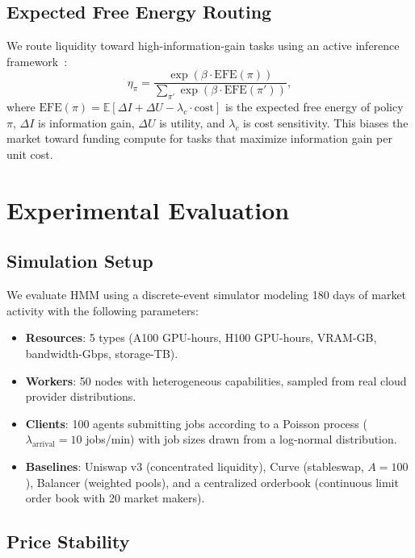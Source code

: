 \documentclass[11pt,twocolumn]{article}
\begin{document}
\subsection{Expected Free Energy Routing}

We route liquidity toward high-information-gain tasks using an active inference framework~\cite{friston2017active}:
\begin{equation}
\eta_\pi = \frac{\exp(\beta \cdot \text{EFE}(\pi))}{\sum_{\pi'} \exp(\beta \cdot \text{EFE}(\pi'))},
\end{equation}
where $\text{EFE}(\pi) = \mathbb{E}[\Delta I + \Delta U - \lambda_c \cdot \text{cost}]$ is the expected free energy of policy $\pi$, $\Delta I$ is information gain, $\Delta U$ is utility, and $\lambda_c$ is cost sensitivity. This biases the market toward funding compute for tasks that maximize information gain per unit cost.

\section{Experimental Evaluation}
\label{sec:experiments}

\subsection{Simulation Setup}

We evaluate HMM using a discrete-event simulator modeling 180 days of market activity with the following parameters:

\begin{itemize}[leftmargin=1.1em]
    \item \textbf{Resources}: 5 types (A100 GPU-hours, H100 GPU-hours, VRAM-GB, bandwidth-Gbps, storage-TB).
    \item \textbf{Workers}: 50 nodes with heterogeneous capabilities, sampled from real cloud provider distributions.
    \item \textbf{Clients}: 100 agents submitting jobs according to a Poisson process ($\lambda_{\text{arrival}} = 10$ jobs/min) with job sizes drawn from a log-normal distribution.
    \item \textbf{Baselines}: Uniswap v3 (concentrated liquidity), Curve (stableswap, $A = 100$), Balancer (weighted pools), and a centralized orderbook (continuous limit order book with 20 market makers).
\end{itemize}

\subsection{Price Stability}
\end{document}

